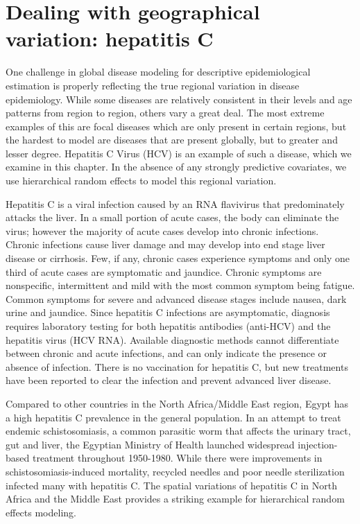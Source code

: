 \chapter{Dealing with geographical variation: hepatitis C}
\label{applications-rfx}

One challenge in global disease modeling for descriptive
epidemiological estimation is properly reflecting the true regional
variation in disease epidemiology. While some diseases are relatively
consistent in their levels and age patterns from region to region,
others vary a great deal.  The most extreme examples of this are focal
diseases which are only present in certain regions, but the hardest to
model are diseases that are present globally, but to greater and lesser
degree.  Hepatitis C Virus (HCV) is an example of such a disease,
which we examine in this chapter.  In the absence of any strongly
predictive covariates, we use hierarchical random effects to model
this regional variation.

Hepatitis C is a viral infection caused by an RNA flavivirus that
predominately attacks the liver.  In a small
portion of acute cases, the body can eliminate the virus; however the
majority of acute cases develop into chronic infections.  Chronic
infections cause liver damage and may develop into end stage liver
disease or cirrhosis.  Few, if any, chronic cases experience symptoms
and only one third of acute cases are symptomatic and jaundice.
Chronic symptoms are nonspecific, intermittent and mild with the most
common symptom being fatigue.  Common symptoms for severe and advanced
disease stages include nausea, dark urine and jaundice.  Since
hepatitis C infections are asymptomatic, diagnosis requires laboratory
testing for both hepatitis antibodies (anti-HCV) and the hepatitis
virus (HCV RNA).  Available diagnostic methods cannot differentiate
between chronic and acute infections, and can only indicate the presence
or absence of infection.  There is no vaccination for hepatitis C, but
new treatments have been reported to clear the infection and
prevent advanced liver disease. \cite{hoofnagle_hepatitis_1997,
  ghany_diagnosis_2009, ghany_update_2011}

Compared to other countries in the North Africa/Middle East region,
Egypt has a high hepatitis C prevalence in the general population.  In an attempt to treat
endemic schistosomiasis, a common parasitic worm that affects the
urinary tract, gut and liver, the Egyptian Ministry of Health launched
widespread injection-based treatment throughout 1950-1980.  While
there were improvements in schistosomiasis-induced mortality, recycled
needles and poor needle sterilization infected many with hepatitis
C. \cite{frank_role_2000, mezban_hepatitis_2006,
  strickland_liver_2006} The spatial variations of hepatitis C in
North Africa and the Middle East provides a striking example for
hierarchical random effects modeling.


